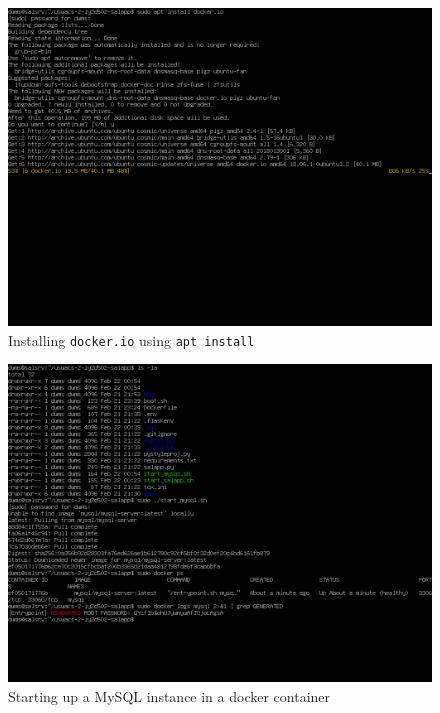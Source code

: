 \pagebreak
\begin{figure}[h!]
\centering
\captionsetup{skip=\skipfigurecaptionlen}
\includegraphics[width=1\textwidth]{screenshots/IY2D502-2019-02-21-23-29-41.png}
\caption{Installing \texttt{docker.io} using \texttt{apt install}}
\label{fig:IY2D502-2019-02-21-23-29-41}
\end{figure}
\pagebreak
\begin{figure}[h!]
\centering
\captionsetup{skip=\skipfigurecaptionlen}
\includegraphics[width=1\textwidth]{screenshots/IY2D502-2019-02-22-00-58-41.png}
\caption{Starting up a MySQL instance in a docker container}
\label{fig:IY2D502-2019-02-22-00-58-41}
\end{figure}
\pagebreak
